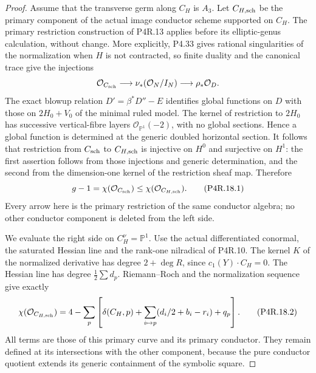 \begin{proof}
Assume that the transverse germ along $C_H$ is $A_3$.
Let $C_{H,\rm sch}$ be the primary component of the actual
image conductor scheme supported on $C_H$. The primary
restriction construction of P4R.13 applies before its
elliptic-genus calculation, without change. More explicitly,
P4.33 gives rational singularities of the normalization when
$H$ is not contracted, so finite duality and the canonical
trace give the injections
\[
 \mathcal O_{C_{\rm sch}}\longrightarrow
 \nu_*(\mathcal O_N/I_N)\longrightarrow\rho_*\mathcal O_D.
\]
The exact blowup relation $D'=\beta^*D''-E$ identifies
global functions on $D$ with those on $2H_0+V_0$ of the
minimal ruled model. The kernel of restriction to $2H_0$
has successive vertical-fibre layers
$\mathcal O_{\mathbb P^1}(-2)$, with no global sections.
Hence a global function is determined at the generic doubled
horizontal section. It follows that restriction from
$C_{\rm sch}$ to $C_{H,\rm sch}$ is injective on $H^0$
and surjective on $H^1$: the first assertion follows from
those injections and generic determination, and the second
from the dimension-one kernel of the restriction sheaf map.
Therefore
\[
                 g-1=\chi(\mathcal O_{C_{\rm sch}})
                    \le\chi(\mathcal O_{C_{H,\rm sch}}).
                                                            \tag{P4R.18.1}
\]
Every arrow here is the primary restriction of the same
conductor algebra; no other conductor component is deleted
from the left side.

We evaluate the right side on $C_H^\nu=\mathbb P^1$.
Use the actual differentiated conormal, the saturated Hessian
line and the rank-one nilradical of P4R.10. The kernel $K$
of the normalized derivative has degree $2+\deg R$, since
$c_1(Y)\cdot C_H=0$. The Hessian line has degree
$\tfrac12\sum d_p$. Riemann--Roch and the normalization
sequence give exactly
\[
 \chi(\mathcal O_{C_{H,\rm sch}})
 =4-\sum_p\left[\delta(C_H,p)
      +\sum_{i\mapsto p}(d_i/2+b_i-r_i)+q_p\right].
                                                            \tag{P4R.18.2}
\]
All terms are those of this primary curve and its primary
conductor. They remain defined at its intersections with
the other component, because the pure conductor quotient
extends its generic containment of the symbolic square.


\end{proof}
